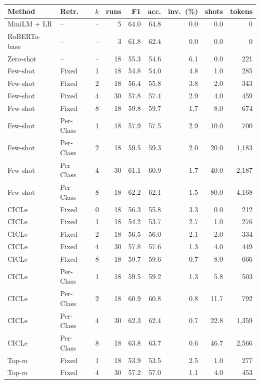\begin{tabular}{llrrrrrrr}
\toprule
Method & Retr. & $k$ & runs & F1 & acc. & inv.\ (\%) & shots & tokens \\
\midrule
MiniLM + LR & -- & -- & 5 & 64.0 & 64.8 & 0.0 & 0.0 & 0 \\
RoBERTa-base & -- & -- & 3 & 61.8 & 62.4 & 0.0 & 0.0 & 0 \\
\midrule
Zero-shot & -- & -- & 18 & 55.3 & 54.6 & 6.1 & 0.0 & 221 \\
\midrule
Few-shot & Fixed & 1 & 18 & 54.8 & 54.0 & 4.8 & 1.0 & 285 \\
Few-shot & Fixed & 2 & 18 & 56.4 & 55.8 & 3.8 & 2.0 & 343 \\
Few-shot & Fixed & 4 & 30 & 57.8 & 57.4 & 2.9 & 4.0 & 459 \\
Few-shot & Fixed & 8 & 18 & 59.8 & 59.7 & 1.7 & 8.0 & 674 \\
Few-shot & Per-Class & 1 & 18 & 57.9 & 57.5 & 2.9 & 10.0 & 700 \\
Few-shot & Per-Class & 2 & 18 & 59.5 & 59.3 & 2.0 & 20.0 & 1,183 \\
Few-shot & Per-Class & 4 & 30 & 61.1 & 60.9 & 1.7 & 40.0 & 2,187 \\
Few-shot & Per-Class & 8 & 18 & 62.2 & 62.1 & 1.5 & 80.0 & 4,168 \\
CICLe & Fixed & 0 & 18 & 56.3 & 55.8 & 3.3 & 0.0 & 212 \\
CICLe & Fixed & 1 & 18 & 54.2 & 53.7 & 2.7 & 1.0 & 276 \\
CICLe & Fixed & 2 & 18 & 56.5 & 56.0 & 2.1 & 2.0 & 334 \\
CICLe & Fixed & 4 & 30 & 57.8 & 57.6 & 1.3 & 4.0 & 449 \\
CICLe & Fixed & 8 & 18 & 59.7 & 59.6 & 0.7 & 8.0 & 666 \\
CICLe & Per-Class & 1 & 18 & 59.5 & 59.2 & 1.3 & 5.8 & 503 \\
CICLe & Per-Class & 2 & 18 & 60.9 & 60.8 & 0.8 & 11.7 & 792 \\
CICLe & Per-Class & 4 & 30 & 62.3 & 62.4 & 0.7 & 22.8 & 1,359 \\
CICLe & Per-Class & 8 & 18 & 63.8 & 63.7 & 0.6 & 46.7 & 2,566 \\
\midrule
Top-$m$ & Fixed & 1 & 18 & 53.9 & 53.5 & 2.5 & 1.0 & 277 \\
Top-$m$ & Fixed & 4 & 30 & 57.2 & 57.0 & 1.1 & 4.0 & 453 \\

\end{tabular}
